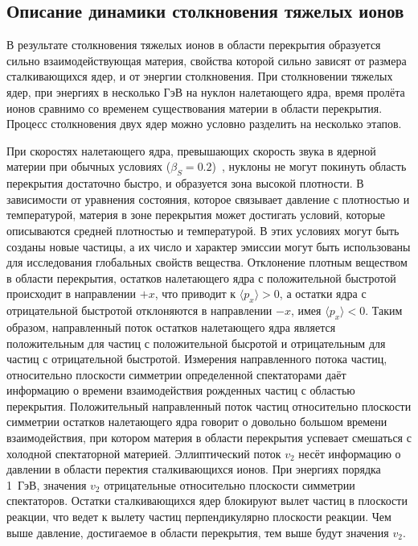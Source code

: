 \subsection{Описание динамики столкновения тяжелых ионов}


В результате столкновения тяжелых ионов в области перекрытия образуется сильно взаимодействующая материя, свойства которой сильно зависят от размера сталкивающихся ядер, и от энергии столкновения.
При столкновении тяжелых ядер, при энергиях в несколько ГэВ на нуклон налетающего ядра, время пролёта ионов сравнимо со временем существования материи в области перекрытия.
Процесс столкновения двух ядер можно условно разделить на несколько этапов.

При скоростях налетающего ядра, превышающих скорость звука в ядерной материи при обычных условиях ($\beta_S=0.2$)~\cite{Weber:1998aa}, нуклоны не могут покинуть область перекрытия достаточно быстро, и образуется зона высокой плотности.
В зависимости от уравнения состояния, которое связывает давление с плотностью и температурой, материя в зоне перекрытия может достигать условий, которые описываются средней плотностью и температурой.
В этих условиях могут быть созданы новые частицы, а их число и характер эмиссии могут быть использованы для исследования глобальных свойств вещества.
Отклонение плотным веществом в области перекрытия, остатков налетающего ядра с положительной быстротой происходит в направлении $+x$, что приводит к $\langle p_x \rangle  > 0$, а остатки ядра с отрицательной быстротой отклоняются в направлении $-x$, имея $\langle p_x \rangle < 0$.
Таким образом, направленный поток остатков налетающего ядра является положительным для частиц с положительной бысротой и отрицательным для частиц с отрицательной быстротой.
Измерения направленного потока частиц, относительно плоскости симметрии определенной спектаторами даёт информацию о времени взаимодействия рожденных частиц с областью перекрытия.
Положительный направленный поток частиц относительно плоскости симметрии остатков налетающего ядра говорит о довольно большом времени взаимодействия, при котором материя в области перекрытия успевает смешаться с холодной спектаторной материей.
Эллиптический поток $v_2$ несёт информацию о давлении в области перектия сталкивающихся ионов.
При энергиях порядка 1~ГэВ, значения $v_2$ отрицательные относительно плоскости симметрии спектаторов.
Остатки сталкивающихся ядер блокируют вылет частиц в плоскости реакции, что ведет к вылету частиц перпендикулярно плоскости реакции.
Чем выше давление, достигаемое в области перекрытия, тем выше будут значения $v_2$.
